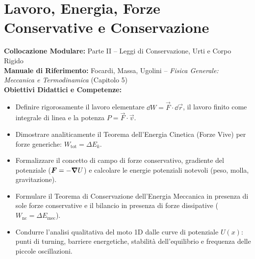 \chapter{Lavoro, Energia, Forze Conservative e Conservazione}
\label{chap:lavoro_energia}

\begin{tcolorbox}[enhanced, breakable, colback=navyblue!4!white, colframe=navyblue!80!black,
    coltitle=white, fonttitle=\bfseries\sffamily, title={Quadro Sinottico del Capitolo 05},
    sharp corners, rounded corners=south, boxrule=1pt]
\textbf{Collocazione Modulare:} Parte II -- Leggi di Conservazione, Urti e Corpo Rigido\\
\textbf{Manuale di Riferimento:} Focardi, Massa, Ugolini -- \emph{Fisica Generale: Meccanica e Termodinamica} (Capitolo 5)\\
\textbf{Obiettivi Didattici e Competenze:}\par
\begin{itemize}
    \item Definire rigorosamente il lavoro elementare $\dd W = \vec{F}\cdot\dd\vec{r}$, il lavoro finito come integrale di linea e la potenza $P = \vec{F}\cdot\vec{v}$.
    \item Dimostrare analiticamente il Teorema dell'Energia Cinetica (Forze Vive) per forze generiche: $W_{\text{tot}} = \Delta E_k$.
    \item Formalizzare il concetto di campo di forze conservativo, gradiente del potenziale ($\bm{F} = -\bm{\nabla} U$) e calcolare le energie potenziali notevoli (peso, molla, gravitazione).
    \item Formulare il Teorema di Conservazione dell'Energia Meccanica in presenza di sole forze conservative e il bilancio in presenza di forze dissipative ($W_{\text{nc}} = \Delta E_{\text{mec}}$).
    \item Condurre l'analisi qualitativa del moto 1D dalle curve di potenziale $U(x)$: punti di turning, barriere energetiche, stabilità dell'equilibrio e frequenza delle piccole oscillazioni.
\end{itemize}
\end{tcolorbox}

\vspace{0.5em}


